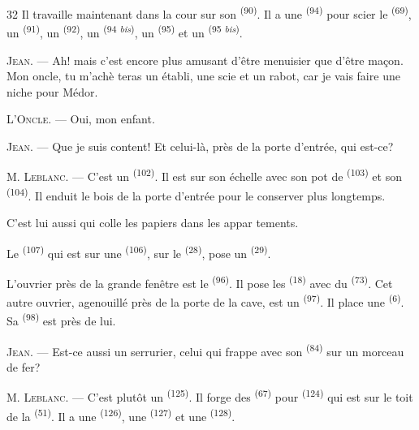\begin{VUpage}[34]{32}
\VUblancAlinea
Il travaille maintenant dans la cour sur son\nl
{} \textsuperscript{(90)}. Il a une  \textsuperscript{(94)} pour scier le  \textsuperscript{(69)}, un\nl
{} \textsuperscript{(91)}, un  \textsuperscript{(92)}, un  \textsuperscript{(94 \textit{bis})}, un\nl
{} \textsuperscript{(95)} et un  \textsuperscript{(95 \textit{bis})}.

\VUblancAlinea
\textsc{Jean}. --- Ah! mais c'est encore plus amusant d'être\nl
menuisier que d'être maçon. Mon oncle, tu m'achè\cc
teras un établi, une scie et un rabot, car je vais faire\nl
une niche pour Médor.

\VUblancAlinea
\textsc{L'Oncle}. --- Oui, mon enfant.

\VUblancAlinea
\textsc{Jean}. --- Que je suis content! Et celui-là, près de\nl
la porte d'entrée, qui est-ce?

\VUblancAlinea
\textsc{M. Leblanc}. --- C'est un  \textsuperscript{(102)}. Il est sur\nl
son échelle avec son pot de  \textsuperscript{(103)} et son\nl
{} \textsuperscript{(104)}. Il enduit le bois de la porte d'entrée\nl
pour le conserver plus longtemps.

\VUblancAlinea
C'est lui aussi qui colle les papiers dans les appar\cc
tements.

\VUblancAlinea
Le  \textsuperscript{(107)} qui est sur une  \textsuperscript{(106)},\nl
sur le  \textsuperscript{(28)}, pose un  \textsuperscript{(29)}.

\VUblancAlinea
L'ouvrier près de la grande fenêtre est le  \textsuperscript{(96)}.\nl
Il pose les  \textsuperscript{(18)} avec du  \textsuperscript{(73)}. Cet autre\nl
ouvrier, agenouillé près de la porte de la cave, est un\nl
{} \textsuperscript{(97)}. Il place une  \textsuperscript{(6)}. Sa  \textsuperscript{(98)}\nl
est près de lui.

\VUblancAlinea
\textsc{Jean}. --- Est-ce aussi un serrurier, celui qui frappe\nl
avec son  \textsuperscript{(84)} sur un morceau de fer?

\VUblancAlinea
\textsc{M. Leblanc}. --- C'est plutôt un  \textsuperscript{(125)}. Il\nl
forge des  \textsuperscript{(67)} pour \cc
{} \textsuperscript{(124)} qui est sur le toit de la  \textsuperscript{(51)}. Il a une\nl
{} \textsuperscript{(126)}, une  \textsuperscript{(127)} et une  \textsuperscript{(128)}.


\end{VUpage}
